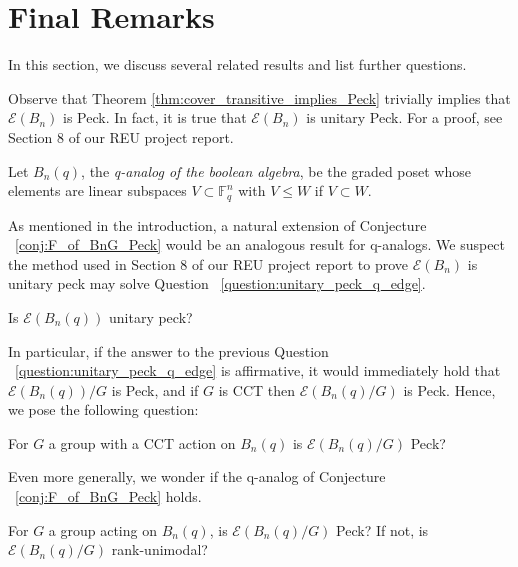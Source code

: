 \documentclass[smallextended]{svjour3}       %
\numberwithin{equation}{section}
\begin{document}
\section{Final Remarks}

In this section, we discuss several related results and list further questions. 

\begin{remark}
Observe that Theorem \ref{thm:cover_transitive_implies_Peck} trivially implies that $\mathcal E(B_n)$ is Peck. In fact, it is true that $\mathcal E(B_n)$ is unitary Peck. For a proof, see Section 8 of our REU project report.
\end{remark}

\begin{definition}
Let $B_n(q)$, the {\it q-analog of the boolean algebra}, be the graded poset whose elements are linear subspaces $V \subset \mathbb F_q^n$ with $V \leq W$ if $V \subset W$.
\end{definition}

As mentioned in the introduction, a natural extension of Conjecture ~\ref{conj:F_of_BnG_Peck} would be an analogous result for q-analogs. We suspect the method used in Section 8 of our REU project report to prove $\mathcal E(B_n)$ is unitary peck may solve Question ~\ref{question:unitary_peck_q_edge}.

\begin{question}
\label{question:unitary_peck_q_edge}
Is $\mathcal E(B_n(q))$ unitary peck?
\end{question}


In particular, if the answer to the previous Question ~\ref{question:unitary_peck_q_edge} is affirmative, it would immediately hold that $\mathcal E(B_n(q))/G$ is Peck, and if $G$ is CCT then $\mathcal E(B_n(q)/G)$ is Peck. Hence, we pose the following question: 

\begin{question}
For $G$ a group with a CCT action on $B_n(q)$ is $\mathcal E(B_n(q)/G)$ Peck?
\end{question}

Even more generally, we wonder if the q-analog of Conjecture ~\ref{conj:F_of_BnG_Peck} holds.

\begin{question}
For $G$ a group acting on $B_n(q)$, is $\mathcal E(B_n(q)/G)$ Peck? If not, is $\mathcal E(B_n(q)/G)$ rank-unimodal?
\end{question}
\end{document}

